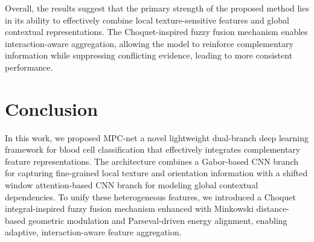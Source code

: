 \documentclass[12pt]{article}
\begin{document}
\begin{table}[!h]
\centering
\caption{Performance of different model variants on the Raabin-WBC dataset}
\vspace{3pt}
\label{tab:ablation_Raabin-WBC}
\end{table}

Overall, the results suggest that the primary strength of the proposed method lies in its ability to effectively combine local texture-sensitive features and global contextual representations. The Choquet-inspired fuzzy fusion mechanism enables interaction-aware aggregation, allowing the model to reinforce complementary information while suppressing conflicting evidence, leading to more consistent performance.


\FloatBarrier
 \section{Conclusion}
In this work, we proposed MPC-net a novel lightweight dual-branch deep learning framework for blood cell classification that effectively integrates complementary feature representations. The architecture combines a Gabor-based CNN branch for capturing fine-grained local texture and orientation information with a shifted window attention-based CNN branch for modeling global contextual dependencies. To unify these heterogeneous features, we introduced a Choquet integral-inspired fuzzy fusion mechanism enhanced with Minkowski distance-based geometric modulation and Parseval-driven energy alignment, enabling adaptive, interaction-aware feature aggregation.
\end{document}
